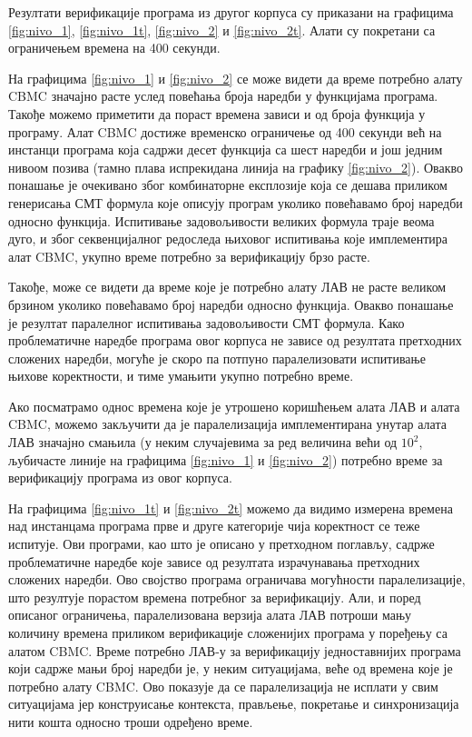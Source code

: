 \documentclass[12pt,oneside]{memoir}
\begin{document}
  Резултати верификације програма из другог корпуса су приказани на графицима \ref{fig:nivo_1}, \ref{fig:nivo_1t}, \ref{fig:nivo_2} и \ref{fig:nivo_2t}. Алати су покретани са ограничењем времена на 400 секунди.
  
  На графицима \ref{fig:nivo_1} и \ref{fig:nivo_2} се може видети да време потребно алату CBMC значајно расте услед повећања броја наредби у функцијама програма.  Такође можемо приметити да пораст времена зависи и од броја функција у програму. Алат CBMC достиже временско ограничење од 400 секунди већ на инстанци програма која садржи десет функција са шест наредби и још једним нивоом позива (тамно плава испрекидана линија на графику \ref{fig:nivo_2}). Овакво понашање је очекивано због комбинаторне експлозије која се дешава приликом генерисања СМТ формула које описују програм уколико повећавамо број наредби односно функција. Испитивање задовољивости великих формула траје веома дуго, и због секвенцијалног редоследа њиховог испитивања које имплементира алат CBMC, укупно време потребно за верификацију брзо расте.
  
  Такође, може се видети да време које је потребно алату ЛАВ не расте великом брзином уколико повећавамо број наредби односно функција. Овакво понашање је резултат паралелног испитивања задовољивости СМТ формула. Како проблематичне наредбе програма овог корпуса не зависе од резултата претходних сложених наредби, могуће је скоро па потпуно паралелизовати испитивање њихове коректности, и тиме умањити укупно потребно време. 
  
  Ако посматрамо однос времена које је утрошено коришћењем алата ЛАВ и алата CBMC, можемо закључити да је паралелизација имплементирана унутар алата ЛАВ значајно смањила (у неким случајевима за ред величина већи од $ 10^{2} $, љубичасте линије на графицима \ref{fig:nivo_1} и \ref{fig:nivo_2}) потребно време за верификацију програма из овог корпуса.
  
  На графицима \ref{fig:nivo_1t} и \ref{fig:nivo_2t} можемо да видимо измерена времена над инстанцама програма прве и друге категорије чија коректност се теже испитује. Ови програми, као што је описано у претходном поглављу, садрже проблематичне наредбе које зависе од резултата израчунавања претходних сложених наредби. Ово својство програма ограничава могућности паралелизације, што резултује порастом времена потребног за верификацију. Али, и поред описаног ограничења, паралелизована верзија алата ЛАВ потроши мању количину времена приликом верификације сложенијих програма у поређењу са алатом CBMC. Време потребно ЛАВ-у за верификацију једноставнијих програма који садрже мањи број наредби је, у неким ситуацијама, веће од времена које је потребно алату CBMC. Ово показује да се паралелизација не исплати у свим ситуацијама јер конструисање контекста, прављење, покретање и синхронизација нити кошта односно троши одређено време.  
  
\end{document}
